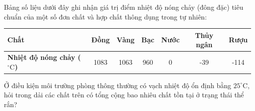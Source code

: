 \begin{ex}	Bảng số liệu dưới đây ghi nhận giá trị điểm nhiệt độ nóng chảy (đông đặc) tiêu chuẩn của một số đơn chất và hợp chất thông dụng trong tự nhiên:
	\begin{center}
		\begin{tabular}{|l|c|c|c|c|c|c|}
			\hline
			\textbf{Chất} & \textbf{Đồng} & \textbf{Vàng} & \textbf{Bạc} & \textbf{Nước} & \textbf{Thủy ngân} & \textbf{Rượu} \\ \hline
			\textbf{Nhiệt độ nóng chảy ($^\circ\text{C}$)} & 1083 & 1063 & 960 & 0 & -39 & -114 \\ \hline
		\end{tabular}
	\end{center}
	Ở điều kiện môi trường phòng thông thường có vạch nhiệt độ ổn định bằng $25^\circ\text{C}$, hỏi trong dải các chất trên có tổng cộng bao nhiêu chất tồn tại ở trạng thái thể rắn?

	\par{}
\end{ex}

